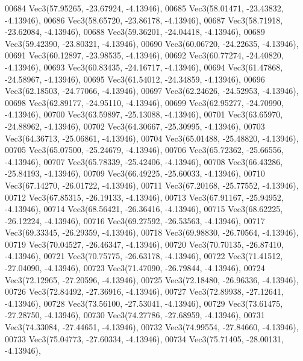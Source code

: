\begin{DoxyCode}
00684         Vec3(57.95265, -23.67924, -4.13946),
00685         Vec3(58.01471, -23.43832, -4.13946),
00686         Vec3(58.65720, -23.86178, -4.13946),
00687         Vec3(58.71918, -23.62084, -4.13946),
00688         Vec3(59.36201, -24.04418, -4.13946),
00689         Vec3(59.42390, -23.80321, -4.13946),
00690         Vec3(60.06720, -24.22635, -4.13946),
00691         Vec3(60.12897, -23.98535, -4.13946),
00692         Vec3(60.77274, -24.40820, -4.13946),
00693         Vec3(60.83435, -24.16717, -4.13946),
00694         Vec3(61.47868, -24.58967, -4.13946),
00695         Vec3(61.54012, -24.34859, -4.13946),
00696         Vec3(62.18503, -24.77066, -4.13946),
00697         Vec3(62.24626, -24.52953, -4.13946),
00698         Vec3(62.89177, -24.95110, -4.13946),
00699         Vec3(62.95277, -24.70990, -4.13946),
00700         Vec3(63.59897, -25.13088, -4.13946),
00701         Vec3(63.65970, -24.88962, -4.13946),
00702         Vec3(64.30667, -25.30995, -4.13946),
00703         Vec3(64.36713, -25.06861, -4.13946),
00704         Vec3(65.01488, -25.48820, -4.13946),
00705         Vec3(65.07500, -25.24679, -4.13946),
00706         Vec3(65.72362, -25.66556, -4.13946),
00707         Vec3(65.78339, -25.42406, -4.13946),
00708         Vec3(66.43286, -25.84193, -4.13946),
00709         Vec3(66.49225, -25.60033, -4.13946),
00710         Vec3(67.14270, -26.01722, -4.13946),
00711         Vec3(67.20168, -25.77552, -4.13946),
00712         Vec3(67.85315, -26.19133, -4.13946),
00713         Vec3(67.91167, -25.94952, -4.13946),
00714         Vec3(68.56421, -26.36416, -4.13946),
00715         Vec3(68.62225, -26.12224, -4.13946),
00716         Vec3(69.27592, -26.53563, -4.13946),
00717         Vec3(69.33345, -26.29359, -4.13946),
00718         Vec3(69.98830, -26.70564, -4.13946),
00719         Vec3(70.04527, -26.46347, -4.13946),
00720         Vec3(70.70135, -26.87410, -4.13946),
00721         Vec3(70.75775, -26.63178, -4.13946),
00722         Vec3(71.41512, -27.04090, -4.13946),
00723         Vec3(71.47090, -26.79844, -4.13946),
00724         Vec3(72.12965, -27.20596, -4.13946),
00725         Vec3(72.18480, -26.96336, -4.13946),
00726         Vec3(72.84492, -27.36916, -4.13946),
00727         Vec3(72.89938, -27.12641, -4.13946),
00728         Vec3(73.56100, -27.53041, -4.13946),
00729         Vec3(73.61475, -27.28750, -4.13946),
00730         Vec3(74.27786, -27.68959, -4.13946),
00731         Vec3(74.33084, -27.44651, -4.13946),
00732         Vec3(74.99554, -27.84660, -4.13946),
00733         Vec3(75.04773, -27.60334, -4.13946),
00734         Vec3(75.71405, -28.00131, -4.13946),

\end{DoxyCode}
